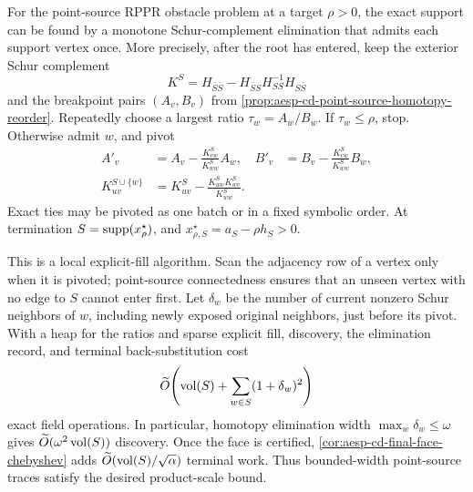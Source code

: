 \begin{theorem}
\label{thm:aesp-cd-point-source-ratio-pivot}
For the point-source RPPR obstacle problem at a target \(\rho>0\), the exact
support can be found by a monotone Schur-complement elimination that admits
each support vertex once.  More precisely, after the root has entered, keep
the exterior Schur complement
\begin{equation*}
 K^S
 =H_{\bar S\bar S}-H_{\bar SS}H_{SS}^{-1}H_{S\bar S}
\end{equation*}
and the breakpoint pairs \((A_v,B_v)\) from
\cref{prop:aesp-cd-point-source-homotopy-reorder}.  Repeatedly choose a
largest ratio \(\tau_w=A_w/B_w\).  If \(\tau_w\leq\rho\), stop.  Otherwise
admit \(w\), and pivot
\begin{align}
 A'_v&=A_v-\frac{K^S_{vw}}{K^S_{ww}}A_w,&
 B'_v&=B_v-\frac{K^S_{vw}}{K^S_{ww}}B_w,
 \label{eq:aesp-cd-ratio-pivot-pair}\\
 K^{S\cup\{w\}}_{uv}
 &=K^S_{uv}-\frac{K^S_{uw}K^S_{wv}}{K^S_{ww}}.
 \label{eq:aesp-cd-ratio-pivot-schur}
\end{align}
Exact ties may be pivoted as one batch or in a fixed symbolic order.
At termination \(S=\operatorname{supp}(x_\rho^\star)\), and
\(x_{\rho,S}^\star=a_S-\rho h_S>0\).

This is a local explicit-fill algorithm.  Scan the adjacency row of a vertex
only when it is pivoted; point-source connectedness ensures that an unseen
vertex with no edge to \(S\) cannot enter first.  Let \(\delta_w\) be the
number of current nonzero Schur neighbors of \(w\), including newly exposed
original neighbors, just before its pivot.  With a heap for the ratios and
sparse explicit fill, discovery, the elimination record, and terminal
back-substitution cost
\begin{equation}
 \widetilde O\!\left(
   \operatorname{vol}(S)+\sum_{w\in S}(1+\delta_w)^2
 \right)
 \label{eq:aesp-cd-ratio-pivot-work}
\end{equation}
exact field operations.  In particular, homotopy elimination width
\(\max_w\delta_w\leq\omega\) gives
\(\widetilde O(\omega^2\operatorname{vol}(S))\) discovery.  Once the face is certified,
\cref{cor:aesp-cd-final-face-chebyshev} adds
\(\widetilde O(\operatorname{vol}(S)/\sqrt\alpha)\) terminal work.  Thus bounded-width
point-source traces satisfy the desired product-scale bound.
\end{theorem}

